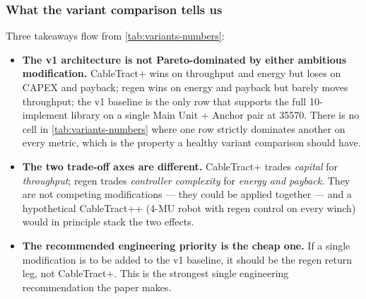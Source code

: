 \documentclass[11pt,a4paper]{article}
\begin{document}
\subsubsection{What the variant comparison tells us}\label{sec:variants-discussion}

Three takeaways flow from \cref{tab:variants-numbers}:

\begin{itemize}[leftmargin=1.6em,itemsep=0.2em]
    \item \textbf{The v1 architecture is not Pareto-dominated by either ambitious modification.} CableTract+ wins on throughput and energy but loses on CAPEX and payback; regen wins on energy and payback but barely moves throughput; the v1 baseline is the only row that supports the full 10-implement library on a single Main Unit + Anchor pair at \SI{35570}{\EUR}. There is no cell in \cref{tab:variants-numbers} where one row strictly dominates another on every metric, which is the property a healthy variant comparison should have.
    \item \textbf{The two trade-off axes are different.} CableTract+ trades \emph{capital} for \emph{throughput}; regen trades \emph{controller complexity} for \emph{energy and payback}. They are not competing modifications --- they could be applied together --- and a hypothetical CableTract++ (4-MU robot with regen control on every winch) would in principle stack the two effects.
    \item \textbf{The recommended engineering priority is the cheap one.} If a single modification is to be added to the v1 baseline, it should be the regen return leg, not CableTract+. This is the strongest single engineering recommendation the paper makes.
\end{itemize}
\end{document}
